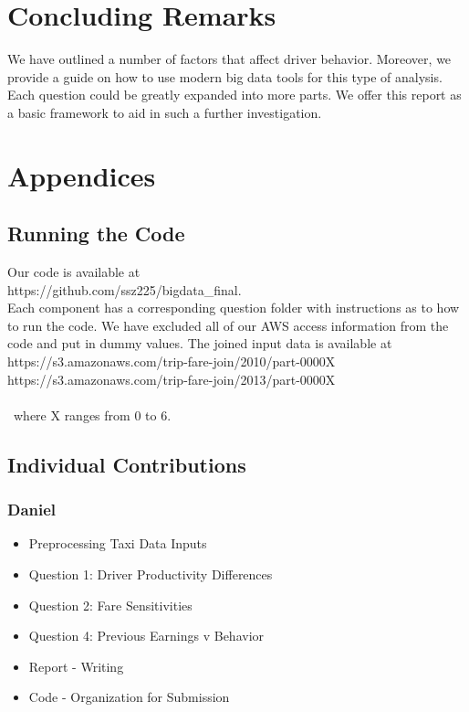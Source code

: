 \documentclass[twoside]{article}
\begin{document}
\begin{multicols}{2}
\section{Concluding Remarks}

We have outlined a number of factors that affect driver behavior. Moreover, we provide a guide on how to use modern big data tools for this type of analysis. Each question could be greatly expanded into more parts. We offer this report as a basic framework to aid in such a further investigation. 






\section{Appendices}

\subsection{Running the Code}

Our code is available at \\

\noindent https://github.com/ssz225/bigdata\_final.\\

\noindent Each component has a corresponding question folder with instructions as to how to run the code. We have excluded all of our AWS access information from the code and put in dummy values.  The joined input data is available at \\

\noindent https://s3.amazonaws.com/trip-fare-join/2010/part-0000X\\
\noindent https://s3.amazonaws.com/trip-fare-join/2013/part-0000X
\\\\\
where X ranges from 0 to 6.

\subsection{Individual Contributions}
\subsubsection*{Daniel}
\begin{itemize}
  \item Preprocessing Taxi Data Inputs
  \item Question 1: Driver Productivity Differences
  \item Question 2: Fare Sensitivities
  \item Question 4: Previous Earnings v Behavior
  \item Report - Writing
  \item Code - Organization for Submission
\end{itemize}



\end{multicols}
\end{document}
